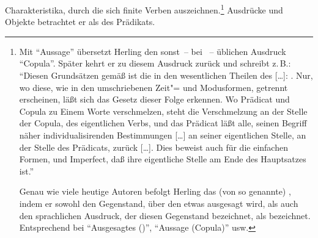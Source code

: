 \documentclass[output=paper]{langsci/langscibook}
\begin{document}
Charakteristika, durch die sich finite Verben auszeichnen.\footnote{%
  Mit "`Aussage"' übersetzt Herling den sonst~-- \zb bei \citet[16ff]{Vater1805}~– üblichen
  Ausdruck "`Copula"'. Später kehrt er zu diesem Ausdruck zurück und schreibt z.\,B.: "`Diesen
  Grundsätzen gemäß ist die  in den wesentlichen Theilen des  [\ldots]:
  . Nur, wo diese, wie in den umschriebenen Zeit"= und Modusformen,
  getrennt erscheinen, läßt sich das Gesetz dieser Folge erkennen. Wo Prädicat und Copula zu Einem
  Worte verschmelzen, steht die Verschmelzung an der Stelle der Copula, des eigentlichen Verbs, und
  das Prädicat läßt alle, seinen Begriff näher individualisirenden Bestimmungen [\ldots] an seiner
  eigentlichen Stelle, an der Stelle des Prädicats, zurück [\ldots]. Dies beweist auch für die einfachen Formen,  und Imperfect, daß ihre
  eigentliche Stelle am Ende des Hauptsatzes ist."' \citep[84]{Herling1830}

  Genau wie viele heutige Autoren befolgt Herling das (von \citealt{Frege1899} so genannte) , indem er \zb sowohl den Gegenstand, über den etwas
  ausgesagt wird, als auch den sprachlichen Ausdruck, der diesen Gegenstand bezeichnet, als 
  bezeichnet. Entsprechend bei "`Ausgesagtes ()"', "`Aussage (Copula)"' usw.%
}
 Ausdrücke
und Objekte betrachtet er als  des Prädikats.
\end{document}
